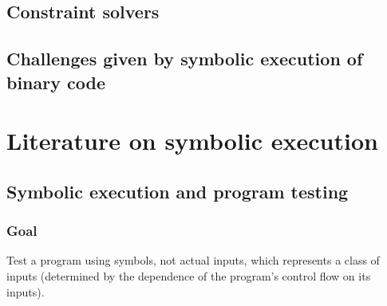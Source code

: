 \documentclass[10pt, a4paper]{article}
\begin{document}
\subsection{Constraint solvers}
\subsection{Challenges given by symbolic execution of binary code}

\section{Literature on symbolic execution}

\subsection{\cite{K-ACM76} Symbolic execution and program testing} 

\subsubsection{Goal}

Test a program using symbols, not actual inputs, which represents a class of inputs (determined by the dependence of the program's control flow on its inputs).
\end{document}
